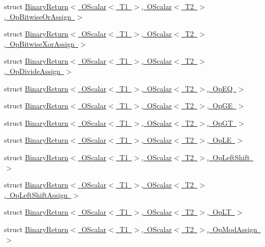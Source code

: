 \begin{DoxyCompactItemize}
\item 
struct \mbox{\hyperlink{structENSEM_1_1BinaryReturn_3_01OScalar_3_01T1_01_4_00_01OScalar_3_01T2_01_4_00_01OpBitwiseOrAssign_01_4}{Binary\+Return$<$ O\+Scalar$<$ T1 $>$, O\+Scalar$<$ T2 $>$, Op\+Bitwise\+Or\+Assign $>$}}
\item 
struct \mbox{\hyperlink{structENSEM_1_1BinaryReturn_3_01OScalar_3_01T1_01_4_00_01OScalar_3_01T2_01_4_00_01OpBitwiseXorAssign_01_4}{Binary\+Return$<$ O\+Scalar$<$ T1 $>$, O\+Scalar$<$ T2 $>$, Op\+Bitwise\+Xor\+Assign $>$}}
\item 
struct \mbox{\hyperlink{structENSEM_1_1BinaryReturn_3_01OScalar_3_01T1_01_4_00_01OScalar_3_01T2_01_4_00_01OpDivideAssign_01_4}{Binary\+Return$<$ O\+Scalar$<$ T1 $>$, O\+Scalar$<$ T2 $>$, Op\+Divide\+Assign $>$}}
\item 
struct \mbox{\hyperlink{structENSEM_1_1BinaryReturn_3_01OScalar_3_01T1_01_4_00_01OScalar_3_01T2_01_4_00_01OpEQ_01_4}{Binary\+Return$<$ O\+Scalar$<$ T1 $>$, O\+Scalar$<$ T2 $>$, Op\+E\+Q $>$}}
\item 
struct \mbox{\hyperlink{structENSEM_1_1BinaryReturn_3_01OScalar_3_01T1_01_4_00_01OScalar_3_01T2_01_4_00_01OpGE_01_4}{Binary\+Return$<$ O\+Scalar$<$ T1 $>$, O\+Scalar$<$ T2 $>$, Op\+G\+E $>$}}
\item 
struct \mbox{\hyperlink{structENSEM_1_1BinaryReturn_3_01OScalar_3_01T1_01_4_00_01OScalar_3_01T2_01_4_00_01OpGT_01_4}{Binary\+Return$<$ O\+Scalar$<$ T1 $>$, O\+Scalar$<$ T2 $>$, Op\+G\+T $>$}}
\item 
struct \mbox{\hyperlink{structENSEM_1_1BinaryReturn_3_01OScalar_3_01T1_01_4_00_01OScalar_3_01T2_01_4_00_01OpLE_01_4}{Binary\+Return$<$ O\+Scalar$<$ T1 $>$, O\+Scalar$<$ T2 $>$, Op\+L\+E $>$}}
\item 
struct \mbox{\hyperlink{structENSEM_1_1BinaryReturn_3_01OScalar_3_01T1_01_4_00_01OScalar_3_01T2_01_4_00_01OpLeftShift_01_4}{Binary\+Return$<$ O\+Scalar$<$ T1 $>$, O\+Scalar$<$ T2 $>$, Op\+Left\+Shift $>$}}
\item 
struct \mbox{\hyperlink{structENSEM_1_1BinaryReturn_3_01OScalar_3_01T1_01_4_00_01OScalar_3_01T2_01_4_00_01OpLeftShiftAssign_01_4}{Binary\+Return$<$ O\+Scalar$<$ T1 $>$, O\+Scalar$<$ T2 $>$, Op\+Left\+Shift\+Assign $>$}}
\item 
struct \mbox{\hyperlink{structENSEM_1_1BinaryReturn_3_01OScalar_3_01T1_01_4_00_01OScalar_3_01T2_01_4_00_01OpLT_01_4}{Binary\+Return$<$ O\+Scalar$<$ T1 $>$, O\+Scalar$<$ T2 $>$, Op\+L\+T $>$}}
\item 
struct \mbox{\hyperlink{structENSEM_1_1BinaryReturn_3_01OScalar_3_01T1_01_4_00_01OScalar_3_01T2_01_4_00_01OpModAssign_01_4}{Binary\+Return$<$ O\+Scalar$<$ T1 $>$, O\+Scalar$<$ T2 $>$, Op\+Mod\+Assign $>$}}

\end{DoxyCompactItemize}
